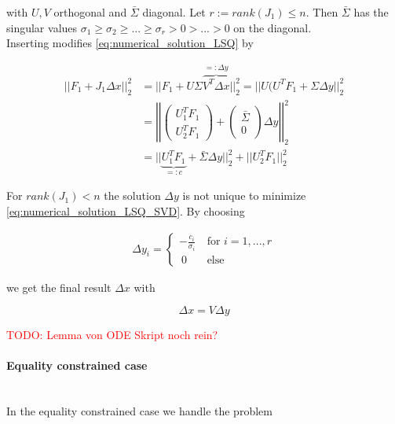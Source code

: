 \documentclass{scrartcl}[12pt, halfparskip]
\newcommand{\todo}[1]{\textcolor{red}{TODO: #1}}
\begin{document}
\begin{itemize}
	with $U, V$ orthogonal and $\bar{\Sigma}$ diagonal. Let $r := rank(J_1) \le n$. Then $\bar{\Sigma}$ has the singular values $\sigma_1 \ge \sigma_2 \ge ... \ge \sigma_r > 0 > ... > 0$ on the diagonal. \\
	Inserting modifies \eqref{eq:numerical_solution_LSQ} by
	
	\begin{align}
		|| F_1 + J_1 \Delta x ||_2^2 & = || F_1 + U \Sigma \overbrace{V^T \Delta x}^{=: \Delta y} ||_2^2 = || U ( U^T F_1 + \Sigma \Delta y ||_2^2 \label{eq:numerical_solution_LSQ_SVD} \\
		& = \left| \left| \begin{pmatrix}
		U_1^T F_1 \\
		U_2^T F_1
		\end{pmatrix} + 
		\begin{pmatrix}
		\bar{\Sigma} \\
		0
		\end{pmatrix}
		\Delta y \right| \right|_2^2 \nonumber \\
		& = || \underbrace{U_1^T F_1}_{=: c} + \bar{\Sigma} \Delta y ||_2^2 + || U_2^T F_1 ||_2^2 \nonumber
	\end{align}
	
	For $rank(J_1) < n$ the solution $\Delta y$ is not unique to minimize \eqref{eq:numerical_solution_LSQ_SVD}. By choosing
	
	\begin{align}
		\Delta y_i = 
		\begin{cases}
			- \frac{c_i}{\sigma_i} \ & \text{for } i=1,...,r \\
			\ 0 \ & \text{else}
		\end{cases}
	\end{align}
	
	we get the final result $\Delta x$ with
	
	\begin{equation}
		\Delta x = V \Delta y
	\end{equation}
	
	\todo{Lemma von ODE Skript noch rein?}

\end{itemize}


\paragraph{Equality constrained case}\mbox{}\\
In the equality constrained case we handle the problem
\end{document}
